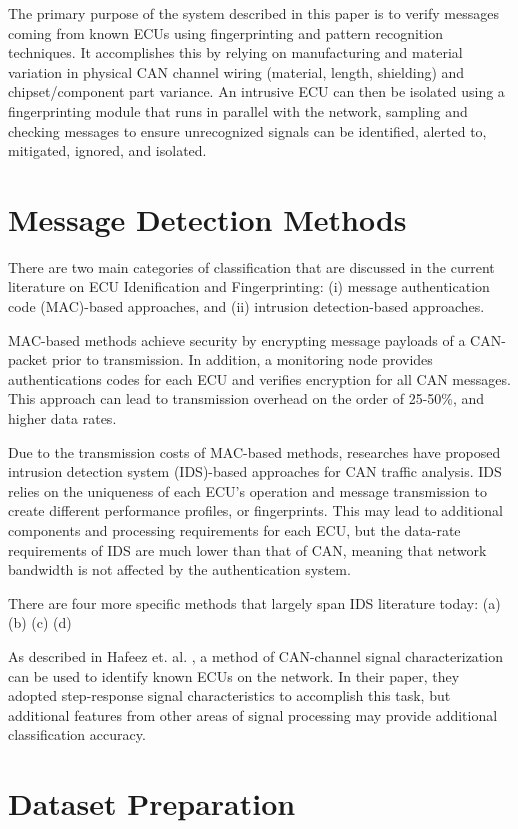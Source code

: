 \documentclass[conference]{IEEEtran}
\begin{document}
The primary purpose of the system described in this paper is to verify messages coming from known ECUs using fingerprinting and pattern recognition techniques. It accomplishes this by relying on manufacturing and material variation in physical CAN channel wiring (material, length, shielding) and chipset/component part variance. An intrusive ECU can then be isolated using a fingerprinting module that runs in parallel with the network, sampling and checking messages to ensure unrecognized signals can be identified, alerted to, mitigated, ignored, and isolated.


\section{Message Detection Methods} \label{sec:MDM}
There are two main categories of classification that are discussed in the current literature on ECU Idenification and Fingerprinting: (i) message authentication code (MAC)-based approaches, and (ii) intrusion detection-based approaches.

MAC-based methods achieve security by encrypting message payloads of a CAN-packet prior to transmission. In addition, a monitoring node provides authentications codes for each ECU and verifies encryption for all CAN messages. This approach can lead to transmission overhead on the order of 25-50\%, and higher data rates.

Due to the transmission costs of MAC-based methods, researches have proposed intrusion detection system (IDS)-based approaches for CAN traffic analysis. IDS relies on the uniqueness of each ECU's operation and message transmission to create different performance profiles, or fingerprints. This may lead to additional components and processing requirements for each ECU, but the data-rate requirements of IDS are much lower than that of CAN, meaning that network bandwidth is not affected by the authentication system.

There are four more specific methods that largely span IDS literature today: (a) (b) (c) (d)

As described in Hafeez et. al. \cite{hafeez2019}, a method of CAN-channel signal characterization can be used to identify known ECUs on the network. In their paper, they adopted step-response signal characteristics to accomplish this task, but additional features from other areas of signal processing may provide additional classification accuracy.




\section{Dataset Preparation}
\end{document}
